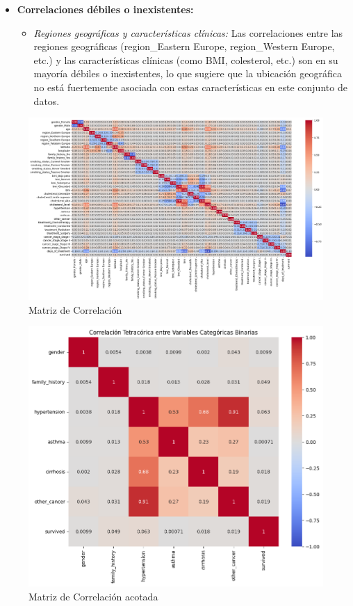 \documentclass[10pt,journal,compsoc]{IEEEtran}
\begin{document}
\begin{itemize}
  \item \textbf{Correlaciones débiles o inexistentes:}
  \begin{itemize}
    \item \emph{Regiones geográficas y características clínicas:} Las correlaciones entre las regiones geográficas (region\_Eastern Europe, region\_Western Europe, etc.) y las características clínicas (como BMI, colesterol, etc.) son en su mayoría débiles o inexistentes, lo que sugiere que la ubicación geográfica no está fuertemente asociada con estas características en este conjunto de datos.
  \end{itemize}


\end{itemize}


\begin{figure}[htb]
    \centering
    \includegraphics[width=\linewidth]{imagenes/MatrixCorrelacion.png}
    \caption{Matriz de Correlación}
    \label{fig:correlacion}
\end{figure}


\begin{figure}[htb]
    \centering
    \includegraphics[width=\linewidth]{imagenes/corr_tetra.png}
    \caption{Matriz de Correlación acotada}
    \label{fig:corr_tetra}
\end{figure}
\end{document}
